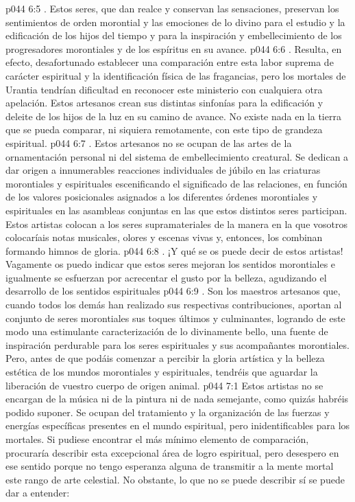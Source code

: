 \vs p044 6:5 . Estos seres, que dan realce y conservan las sensaciones, preservan los sentimientos de orden morontial y las emociones de lo divino para el estudio y la edificación de los hijos del tiempo y para la inspiración y embellecimiento de los progresadores morontiales y de los espíritus en su avance.
\vs p044 6:6 . Resulta, en efecto, desafortunado establecer una comparación entre esta labor suprema de carácter espiritual y la identificación física de las fragancias, pero los mortales de Urantia tendrían dificultad en reconocer este ministerio con cualquiera otra apelación. Estos artesanos crean sus distintas sinfonías para la edificación y deleite de los hijos de la luz en su camino de avance. No existe nada en la tierra que se pueda comparar, ni siquiera remotamente, con este tipo de grandeza espiritual.
\vs p044 6:7 . Estos artesanos no se ocupan de las artes de la ornamentación personal ni del sistema de embellecimiento creatural. Se dedican a dar origen a innumerables reacciones individuales de júbilo en las criaturas morontiales y espirituales escenificando el significado de las relaciones, en función de los valores posicionales asignados a los diferentes órdenes morontiales y espirituales en las asambleas conjuntas en las que estos distintos seres participan. Estos artistas colocan a los seres supramateriales de la manera en la que vosotros colocaríais notas musicales, olores y escenas vivas y, entonces, los combinan formando himnos de gloria.
\vs p044 6:8 . ¡Y qué se os puede decir de estos artistas! Vagamente os puedo indicar que estos seres mejoran los sentidos morontiales e igualmente se esfuerzan por acrecentar el gusto por la belleza, agudizando el desarrollo de los sentidos espirituales
\vs p044 6:9 . Son los maestros artesanos que, cuando todos los demás han realizado sus respectivas contribuciones, aportan al conjunto de seres morontiales sus toques últimos y culminantes, logrando de este modo una estimulante caracterización de lo divinamente bello, una fuente de inspiración perdurable para los seres espirituales y sus acompañantes morontiales. Pero, antes de que podáis comenzar a percibir la gloria artística y la belleza estética de los mundos morontiales y espirituales, tendréis que aguardar la liberación de vuestro cuerpo de origen animal.
\vs p044 7:1 Estos artistas no se encargan de la música ni de la pintura ni de nada semejante, como quizás habréis podido suponer. Se ocupan del tratamiento y la organización de las fuerzas y energías específicas presentes en el mundo espiritual, pero inidentificables para los mortales. Si pudiese encontrar el más mínimo elemento de comparación, procuraría describir esta excepcional área de logro espiritual, pero desespero en ese sentido porque no tengo esperanza alguna de transmitir a la mente mortal este rango de arte celestial. No obstante, lo que no se puede describir sí se puede dar a entender:
